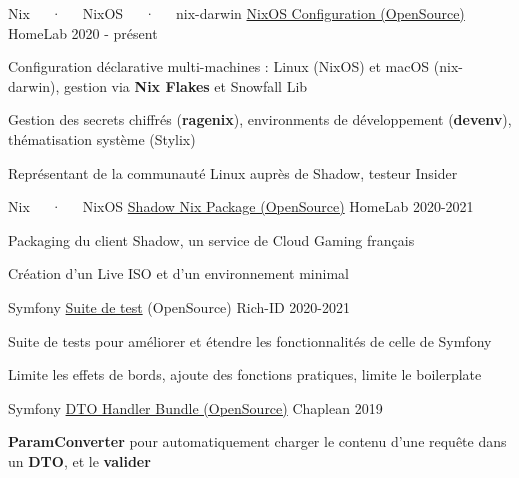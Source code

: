\begin{cventries}
	\cventry
	{Nix~~~·~~~NixOS~~~·~~~nix-darwin}
	{\href{https://gitlab.com/NicolasGuilloux/nixos-configuration}{NixOS Configuration (OpenSource)}}
	{HomeLab}
	{2020 - présent}
	{
		\begin{cvitems} %
			\item {Configuration déclarative multi-machines : Linux (NixOS) et macOS (nix-darwin), gestion via \textbf{Nix Flakes} et Snowfall Lib}
			\item {Gestion des secrets chiffrés (\textbf{ragenix}), environments de développement (\textbf{devenv}), thématisation système (Stylix)}
			\item {Représentant de la communauté Linux auprès de Shadow, testeur Insider}
		\end{cvitems}
	}

	\cventry
	{Nix~~~·~~~NixOS}
	{\href{https://github.com/NicolasGuilloux/shadow-nix}{Shadow Nix Package (OpenSource)}}
	{HomeLab}
	{2020-2021}
	{
		\begin{cvitems} %
			\item {Packaging du client Shadow, un service de Cloud Gaming français}
			\item {Création d'un Live ISO et d'un environnement minimal}
		\end{cvitems}
	}

	\cventry
	{Symfony}
	{\href{https://github.com/rich-id/test-suite}{Suite de test} (OpenSource)}
	{Rich-ID}
	{2020-2021}
	{
		\begin{cvitems} %
			\item {Suite de tests pour améliorer et étendre les fonctionnalités de celle de Symfony}
			\item {Limite les effets de bords, ajoute des fonctions pratiques, limite le boilerplate}
		\end{cvitems}
	}

	\cventry
	{Symfony}
	{\href{https://github.com/NicolasGuilloux/chaplean-dto-handler-bundle}{DTO Handler Bundle (OpenSource)}}
	{Chaplean}
	{2019}
	{
		\begin{cvitems} %
			\item {\textbf{ParamConverter} pour automatiquement charger le contenu d'une requête dans un \textbf{DTO}, et le \textbf{valider}}
		\end{cvitems}
	}

\end{cventries}
